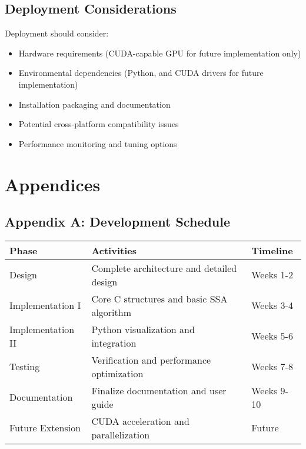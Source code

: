 \documentclass[conference]{IEEEtran}
\begin{document}
\subsection{Deployment Considerations}
Deployment should consider:
\begin{itemize}
    \item Hardware requirements (CUDA-capable GPU for future implementation only)
    \item Environmental dependencies (Python, and CUDA drivers for future implementation)
    \item Installation packaging and documentation
    \item Potential cross-platform compatibility issues
    \item Performance monitoring and tuning options
\end{itemize}

\section{Appendices}

\subsection{Appendix A: Development Schedule}
\begin{center}
\begin{tabular}{|l|p{7.5cm}|l|}
\hline
\textbf{Phase} & \textbf{Activities} & \textbf{Timeline} \\
\hline
Design & Complete architecture and detailed design & Weeks 1-2 \\
\hline
Implementation I & Core C structures and basic SSA algorithm & Weeks 3-4 \\
\hline
Implementation II & Python visualization and integration & Weeks 5-6 \\
\hline
Testing & Verification and performance optimization & Weeks 7-8 \\
\hline
Documentation & Finalize documentation and user guide & Weeks 9-10 \\
\hline
Future Extension & CUDA acceleration and parallelization & Future \\
\hline
\end{tabular}
\end{center}
\end{document}
